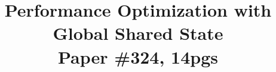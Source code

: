 \documentclass{sig-alternate-10pt}
\begin{document}
\title{Performance Optimization with Global Shared State\\
  \normalsize{Paper \#324, 14pgs}\vspace{-0.5cm}}


\maketitle 


















{\scriptsize


}


%
\end{document}

